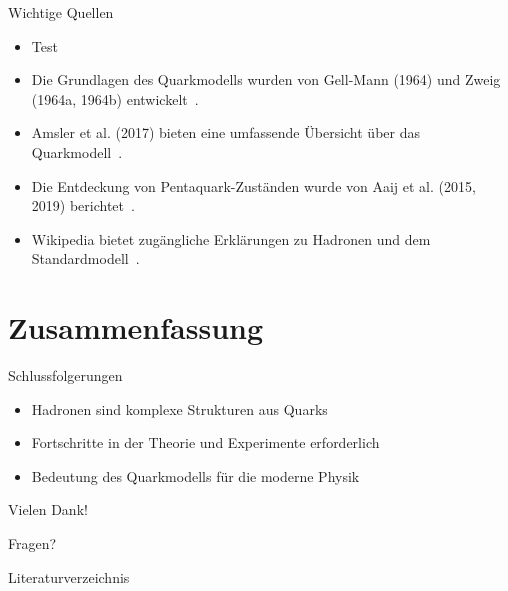 \documentclass[aspectratio=169]{beamer} %
\begin{document}
    \begin{frame}{Wichtige Quellen}
        \begin{itemize}
          \item Test
            \item Die Grundlagen des Quarkmodells wurden von Gell-Mann (1964) und Zweig (1964a, 1964b) entwickelt~\cite{GellMann.1964, Zweig.1964, Zweig.1964b}.
            \item Amsler et al. (2017) bieten eine umfassende Übersicht über das Quarkmodell~\cite{C.Amsler.2017}.
            \item Die Entdeckung von Pentaquark-Zuständen wurde von Aaij et al. (2015, 2019) berichtet~\cite{Aaij.2019}.
            \item Wikipedia bietet zugängliche Erklärungen zu Hadronen und dem Standardmodell~\cite{Wikipedia.Hadron, Wikipedia.Standardmodell}.
        \end{itemize}
    \end{frame}
    
    \section{Zusammenfassung}
    \begin{frame}{Schlussfolgerungen}
        \begin{itemize}
            \item Hadronen sind komplexe Strukturen aus Quarks
            \item Fortschritte in der Theorie und Experimente erforderlich
            \item Bedeutung des Quarkmodells für die moderne Physik
        \end{itemize}
    \end{frame}
    
    \begin{frame}{Vielen Dank!}
        \begin{center}
            \Huge Fragen?
        \end{center}
    \end{frame}

    \begin{frame}[allowframebreaks]{Literaturverzeichnis}
        \printbibliography[nottype=unpublished]
    \end{frame}
\end{document}
